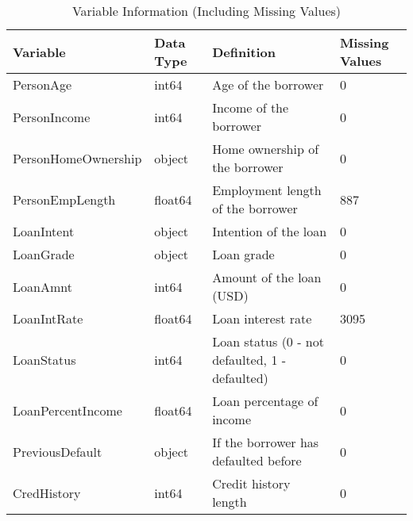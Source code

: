 \begin{table}[H]\centering
\caption{Variable Information (Including Missing Values)}
\label{Table 1:variable_info}
\begin{tabular}{llll}
\toprule
Variable & Data Type & Definition & Missing Values \\
\midrule
PersonAge & int64 & Age of the borrower & 0 \\
PersonIncome & int64 & Income of the borrower & 0 \\
PersonHomeOwnership & object & Home ownership of the borrower & 0 \\
PersonEmpLength & float64 & Employment length of the borrower & 887 \\
LoanIntent & object & Intention of the loan & 0 \\
LoanGrade & object & Loan grade & 0 \\
LoanAmnt & int64 & Amount of the loan (USD) & 0 \\
LoanIntRate & float64 & Loan interest rate & 3095 \\
LoanStatus & int64 & Loan status (0 - not defaulted, 1 - defaulted) & 0 \\
LoanPercentIncome & float64 & Loan percentage of income & 0 \\
PreviousDefault & object & If the borrower has defaulted before & 0 \\
CredHistory & int64 & Credit history length & 0 \\
\bottomrule
\end{tabular}
\end{table}

